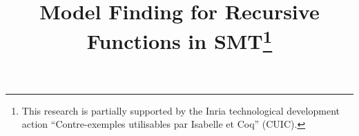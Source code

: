 \newcommand\ty[1]{\con{#1}}
\newcommand{\Bool}{\ty{Bool}}
\newcommand{\ltrue}{\top}
\newcommand{\lfalse}{\bot}
\newcommand{\lite}{\con{ite}}

\newcommand\concret{\gamma} %

\newcommand{\boolop}{\con{b}}
\newcommand{\forallf}[1]{\forall_{\!#1\:}}
\newcommand{\fnull}{\emptyset}
\newcommand{\vecfarg}[1]{\vec{\concret}_{#1}}
\newcommand{\farg}[1]{\concret_{#1}}
\newcommand{\fargx}[2]{\concret_{#1,#2}}
\newcommand{\fargtype}[1]{\alpha_{#1}}

\newcommand{\Sigmalia}{\Sigma_{\mathcalx{LIA}}}
\newcommand{\extendsig}[1]{\mathcalx{E}( #1 )}

\newcommand{\rem}[1]{\textcolor{red}{[#1]}}
\newcommand{\ajr}[1]{\rem{#1 --ajr}}
\newcommand{\jb}[1]{\rem{#1 --jb}}
\newcommand{\ct}[1]{\rem{#1 --ct}}

\newcommand{\negvthinspace}{\kern-0.083333em}
\newcommand{\vthinspace}{\kern+0.083333em}
\newcommand{\vvthinspace}{\kern+0.0416666em}
\newcommand{\typ}[1]{^{\vthinspace #1}}

\newcommand{\definefunreccmd}{\con{define}\text{-}\con{fun}\text{-}\con{rec}}
\newcommand{\definefunsreccmd}{\con{define}\text{-}\con{funs}\text{-}\con{rec}}

\newcommand{\Mo}{{\mathcal{I}}}

\newcommand{\euf}{\ensuremath{\mathcalx{UF}}\xspace}
\newcommand{\ari}{\ensuremath{\mathcalx{A}}\xspace}

\newcommand{\absconstraints}{\mathrm{X}}

%
%
\usepackage{program}

\def\squareforqed{\hbox{\rlap{$\sqcap$}$\sqcup$}}

\newcommand\xend{{\hfill$\scriptstyle\blacksquare$}}
\renewcommand\qed{{\hfill$\squareforqed$}}


\let\labelitemi=\labelitemii %
\makeatletter
\ps@myheadings
\makeatother



\title{Model Finding for Recursive Functions in SMT\thanks{%
This research is partially supported by the Inria technological development
action ``Contre-exemples utilisables par Isabelle et Coq'' (CUIC).
}
}


